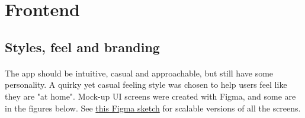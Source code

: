 \documentclass{report}
\begin{document}
\section{Frontend}
\subsection{Styles, feel and branding}
\paragraph{}
The app should be intuitive, casual and approachable, but still have some personality. A quirky yet casual feeling style was chosen to help users feel like they are "at home". Mock-up UI screens were created with Figma, and some are in the figures below. See \href{https://www.figma.com/file/7vs7errfunZKlr1wT6j52Z/faded}{this Figma sketch} for scalable versions of all the screens.
\end{document}
